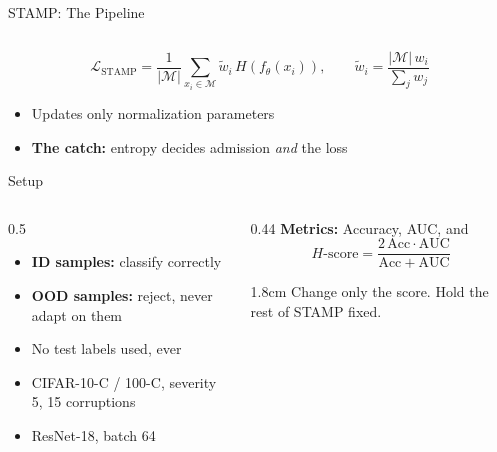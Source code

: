 \documentclass[aspectratio=169,10pt]{beamer}
\begin{document}
\begin{frame}{STAMP: The Pipeline}
\begin{columns}[T]
  \end{columns}
  \vspace{3mm}
  \small
  \[
    \mathcal{L}_{\mathrm{STAMP}} = \frac{1}{|\mathcal{M}|}\sum_{x_i\in\mathcal{M}} \widetilde{w}_i\, H\!\left(f_\theta(x_i)\right),
    \qquad
    \widetilde{w}_i=\frac{|\mathcal{M}|\,w_i}{\sum_j w_j}
  \]
  \vspace{2mm}
  \begin{itemize}
    \setlength\itemsep{1.5mm}\footnotesize
    \item Updates only normalization parameters
    \item \textbf{The catch:} entropy decides admission \emph{and} the loss
  \end{itemize}
\end{frame}

\begin{frame}{Setup}
  \begin{columns}[T]
    \begin{column}{0.5\textwidth}
      \begin{itemize}
        \setlength\itemsep{3mm}
        \item \textbf{\color{Navy}ID samples:} classify correctly
        \item \textbf{\color{Navy}OOD samples:} reject, never adapt on them
        \item No test labels used, ever
        \item CIFAR-10-C / 100-C, severity 5, 15 corruptions
        \item ResNet-18, batch 64
      \end{itemize}
    \end{column}
    \begin{column}{0.44\textwidth}
      \textbf{\color{Navy}Metrics:} Accuracy, AUC, and
      \[
        H\text{-score} = \frac{2\,\mathrm{Acc}\cdot\mathrm{AUC}}{\mathrm{Acc}+\mathrm{AUC}}
      \]
      \vspace{2mm}
      \begin{cardh}{1.8cm}
        \centering\sffamily\color{Navy}\small
        Change only the score. Hold the rest of STAMP fixed.
      \end{cardh}
    \end{column}
  \end{columns}
\end{frame}
\end{document}
